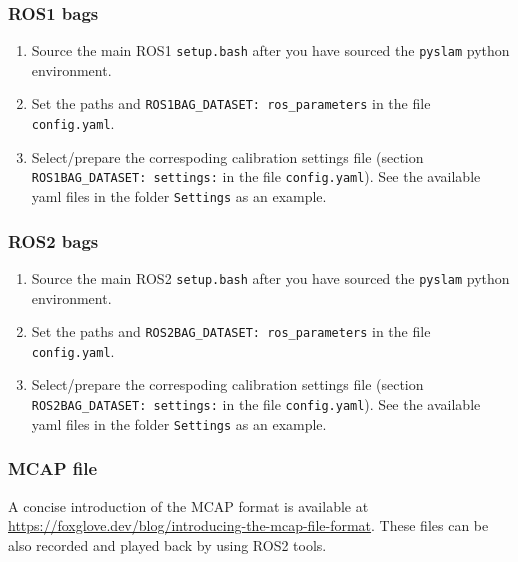 \documentclass{article}
\providecommand{\tightlist}{%
  \setlength{\itemsep}{0pt}\setlength{\parskip}{0pt}}
\begin{document}
\hypertarget{ros1-bags}{%
\subsubsection{ROS1 bags}\label{ros1-bags}}

\begin{enumerate}
\def\labelenumi{\arabic{enumi}.}
\tightlist
\item
  Source the main ROS1 \texttt{setup.bash} after you have sourced the
  \texttt{pyslam} python environment.
\item
  Set the paths and \texttt{ROS1BAG\_DATASET:\ ros\_parameters} in the
  file \texttt{config.yaml}.
\item
  Select/prepare the correspoding calibration settings file (section
  \texttt{ROS1BAG\_DATASET:\ settings:} in the file
  \texttt{config.yaml}). See the available yaml files in the folder
  \texttt{Settings} as an example.
\end{enumerate}

\hypertarget{ros2-bags}{%
\subsubsection{ROS2 bags}\label{ros2-bags}}

\begin{enumerate}
\def\labelenumi{\arabic{enumi}.}
\tightlist
\item
  Source the main ROS2 \texttt{setup.bash} after you have sourced the
  \texttt{pyslam} python environment.
\item
  Set the paths and \texttt{ROS2BAG\_DATASET:\ ros\_parameters} in the
  file \texttt{config.yaml}.
\item
  Select/prepare the correspoding calibration settings file (section
  \texttt{ROS2BAG\_DATASET:\ settings:} in the file
  \texttt{config.yaml}). See the available yaml files in the folder
  \texttt{Settings} as an example.
\end{enumerate}


\hypertarget{mcap-file}{%
\subsubsection{MCAP file}\label{mcap-file}}

A concise introduction of the MCAP format is available at \href{https://foxglove.dev/blog/introducing-the-mcap-file-format}{https://foxglove.dev/blog/introducing-the-mcap-file-format}. These files can be also recorded and played back by using ROS2 tools.  
\end{document}
